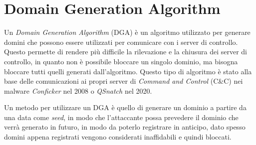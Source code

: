 \section{Domain Generation Algorithm}
\label{atk:dga}

Un \emph{Domain Generation Algorithm} (DGA) è un algoritmo utilizzato per generare domini che possono essere utilizzati per comunicare con i server di controllo. Questo permette di rendere più difficile la rilevazione e la chiusura dei server di controllo, in quanto non è possibile bloccare un singolo dominio, ma bisogna bloccare tutti quelli generati dall'algoritmo. Questo tipo di algoritmo è stato alla base delle comunicazioni ai propri server di \emph{Command and Control} (C\&C) nei malware \emph{Conficker}\cite{site:paloalto-dga} nel 2008 o \emph{QSnatch}\cite{site:qsnatch-dga} nel 2020.

Un metodo per utilizzare un DGA è quello di generare un dominio a partire da una data come \emph{seed}, in modo che l'attaccante possa prevedere il dominio che verrà generato in futuro, in modo da poterlo registrare in anticipo, dato spesso domini appena registrati vengono considerati inaffidabili e quindi bloccati.

